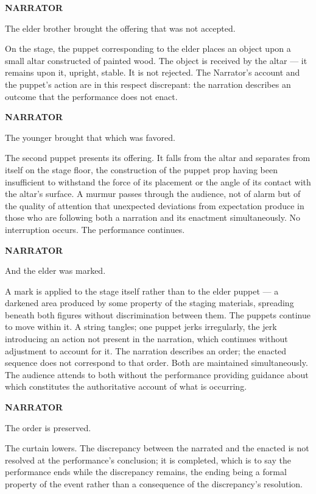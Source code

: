 \documentclass[12pt, oneside]{article}
\newenvironment{action}{%
  \vspace{0.6em}%
  \noindent\ignorespaces%
}{%
  \par\vspace{0.6em}%
}
\newcommand{\character}[1]{%
  \vspace{0.8em}%
  \begin{center}%
    \bfseries\MakeUppercase{#1}%
  \end{center}%
  \vspace{-0.3em}%
}
\newenvironment{dialogue}{%
  \vspace{0.2em}%
  \begin{list}{}{%
    \setlength{\leftmargin}{1.2in}%
    \setlength{\rightmargin}{0.8in}%
    \setlength{\itemsep}{0.6em}%
    \setlength{\parsep}{0pt}%
  }%
}{%
  \end{list}%
  \vspace{0.4em}%
}
\newcommand{\says}[2]{%
  \character{#1}%
  \begin{dialogue}\item #2\end{dialogue}%
}
\begin{document}
\says{Narrator}{The elder brother brought the offering that was not accepted.}

\begin{action}
On the stage, the puppet corresponding to the elder places an object upon a small altar constructed of painted wood. The object is received by the altar --- it remains upon it, upright, stable. It is not rejected. The Narrator's account and the puppet's action are in this respect discrepant: the narration describes an outcome that the performance does not enact.
\end{action}

\says{Narrator}{The younger brought that which was favored.}

\begin{action}
The second puppet presents its offering. It falls from the altar and separates from itself on the stage floor, the construction of the puppet prop having been insufficient to withstand the force of its placement or the angle of its contact with the altar's surface. A murmur passes through the audience, not of alarm but of the quality of attention that unexpected deviations from expectation produce in those who are following both a narration and its enactment simultaneously. No interruption occurs. The performance continues.
\end{action}

\says{Narrator}{And the elder was marked.}

\begin{action}
A mark is applied to the stage itself rather than to the elder puppet --- a darkened area produced by some property of the staging materials, spreading beneath both figures without discrimination between them. The puppets continue to move within it. A string tangles; one puppet jerks irregularly, the jerk introducing an action not present in the narration, which continues without adjustment to account for it. The narration describes an order; the enacted sequence does not correspond to that order. Both are maintained simultaneously. The audience attends to both without the performance providing guidance about which constitutes the authoritative account of what is occurring.
\end{action}

\says{Narrator}{The order is preserved.}

\begin{action}
The curtain lowers. The discrepancy between the narrated and the enacted is not resolved at the performance's conclusion; it is completed, which is to say the performance ends while the discrepancy remains, the ending being a formal property of the event rather than a consequence of the discrepancy's resolution.
\end{action}
\end{document}
